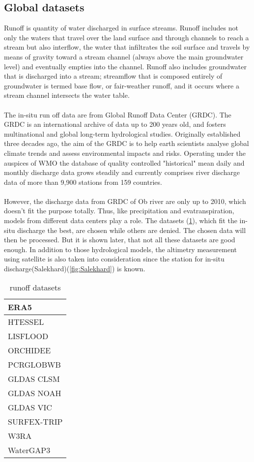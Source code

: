 \subsection{Global datasets}
Runoff is quantity of water discharged in surface streams. Runoff includes not only the waters that travel over the land surface and through channels to reach a stream but also interflow, the water that infiltrates the soil surface and travels by means of gravity toward a stream channel (always above the main groundwater level) and eventually empties into the channel. Runoff also includes groundwater that is discharged into a stream; streamflow that is composed entirely of groundwater is termed base flow, or fair-weather runoff, and it occurs where a stream channel intersects the water table.\\\\
The in-situ run off data are from Global Runoff Data Center (GRDC). The GRDC is an international archive of data up to 200 years old, and fosters multinational and global long-term hydrological studies. Originally established three decades ago, the aim of the GRDC is to help earth scientists analyse global climate trends and assess environmental impacts and risks. Operating under the auspices of WMO the database of quality controlled "historical" mean daily and monthly discharge data grows steadily and currently comprises river discharge data of more than 9,900 stations from 159 countries.\\\\
However, the discharge data from GRDC of Ob river are only up to 2010, which doesn't fit the purpose totally. Thus, like precipitation and evatranspiration, models from different data centers play a role. The datasets (\ref{tab:runoff}), which fit the in-situ discharge the best, are chosen while others are denied. The chosen data will then be processed. But it is shown later, that not all these datasets are good enough. In addition to those hydrological models, the altimetry measurement using satellite is also taken into consideration since the station for in-situ discharge(Salekhard)(\ref{fig:Salekhard}) is known. 
\begin{table}[htbp]\centering
	\begin{tabular}{|l|}
		\hline
		ERA5        \\ \hline
		HTESSEL     \\ \hline
		LISFLOOD    \\ \hline
		ORCHIDEE    \\ \hline
		PCRGLOBWB   \\ \hline
		GLDAS CLSM  \\ \hline
		GLDAS NOAH  \\ \hline
		GLDAS VIC   \\ \hline
		SURFEX-TRIP \\ \hline
		W3RA        \\ \hline
		WaterGAP3   \\ \hline
	\end{tabular}
	\label{tab:runoff}
	\caption{runoff datasets}
\end{table}
